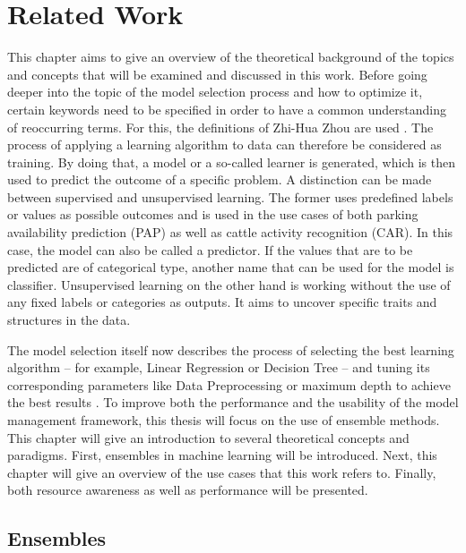 \chapter{Related Work} \label{chap:relatedwork}

This chapter aims to give an overview of the theoretical background of the topics and concepts that will be examined and discussed in this work. Before going deeper into the topic of the model selection process and how to optimize it, certain keywords need to be specified in order to have a common understanding of reoccurring terms. For this, the definitions of Zhi-Hua Zhou are used \cite{zhou2012}. The process of applying a learning algorithm to data can therefore be considered as training. By doing that, a model or a so-called learner is generated, which is then used to predict the outcome of a specific problem. A distinction can be made between supervised and unsupervised learning. The former uses predefined labels or values as possible outcomes and is used in the use cases of both parking availability prediction (PAP) as well as cattle activity recognition (CAR). In this case, the model can also be called a predictor. If the values that are to be predicted are of categorical type, another name that can be used for the model is classifier. Unsupervised learning on the other hand is working without the use of any fixed labels or categories as outputs. It aims to uncover specific traits and structures in the data.

The model selection itself now describes the process of selecting the best learning algorithm – for example, Linear Regression or Decision Tree – and tuning its corresponding parameters like Data Preprocessing or maximum depth to achieve the best results \cite{zhou2012}. To improve both the performance and the usability of the model management framework, this thesis will focus on the use of ensemble methods. This chapter will give an introduction to several theoretical concepts and paradigms. First, ensembles in machine learning will be introduced. Next, this chapter will give an overview of the use cases that this work refers to. Finally, both resource awareness as well as performance will be presented.


\section{Ensembles} \label{ensembles}


